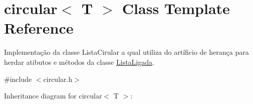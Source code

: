 \hypertarget{classcircular}{}\section{circular$<$ T $>$ Class Template Reference}
\label{classcircular}


Implementação da classe Lista\+Cirular a qual utiliza do artíficio de herança para herdar atibutos e métodos da classe \textquotesingle{}\hyperlink{classListaLigada}{Lista\+Ligada}\textquotesingle{}.  




{\ttfamily \#include $<$circular.\+h$>$}



Inheritance diagram for circular$<$ T $>$\+:
